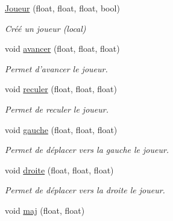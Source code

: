 \begin{DoxyCompactItemize}
\item 
\hypertarget{classJoueur_a87d494582f5a79f5b9e488b933342123}{\hyperlink{classJoueur_a87d494582f5a79f5b9e488b933342123}{Joueur} (float, float, float, bool)}\label{classJoueur_a87d494582f5a79f5b9e488b933342123}

\begin{DoxyCompactList}\small\item\em Créé un joueur (local) \end{DoxyCompactList}\item 
\hypertarget{classJoueur_a48131f41f401d5bc8ba619cc6501fefb}{void \hyperlink{classJoueur_a48131f41f401d5bc8ba619cc6501fefb}{avancer} (float, float, float)}\label{classJoueur_a48131f41f401d5bc8ba619cc6501fefb}

\begin{DoxyCompactList}\small\item\em Permet d'avancer le joueur. \end{DoxyCompactList}\item 
\hypertarget{classJoueur_a00e986852193988432d5bd7bd0f39280}{void \hyperlink{classJoueur_a00e986852193988432d5bd7bd0f39280}{reculer} (float, float, float)}\label{classJoueur_a00e986852193988432d5bd7bd0f39280}

\begin{DoxyCompactList}\small\item\em Permet de reculer le joueur. \end{DoxyCompactList}\item 
\hypertarget{classJoueur_a9879f99716a2e8c3379bb50da2f9003c}{void \hyperlink{classJoueur_a9879f99716a2e8c3379bb50da2f9003c}{gauche} (float, float, float)}\label{classJoueur_a9879f99716a2e8c3379bb50da2f9003c}

\begin{DoxyCompactList}\small\item\em Permet de déplacer vers la gauche le joueur. \end{DoxyCompactList}\item 
\hypertarget{classJoueur_a7cc3a3760137a4af263f8c280a32543e}{void \hyperlink{classJoueur_a7cc3a3760137a4af263f8c280a32543e}{droite} (float, float, float)}\label{classJoueur_a7cc3a3760137a4af263f8c280a32543e}

\begin{DoxyCompactList}\small\item\em Permet de déplacer vers la droite le joueur. \end{DoxyCompactList}\item 
\hypertarget{classJoueur_ab37feae3df59b6af024642660a216628}{void \hyperlink{classJoueur_ab37feae3df59b6af024642660a216628}{maj} (float, float)}\label{classJoueur_ab37feae3df59b6af024642660a216628}


\end{DoxyCompactItemize}
